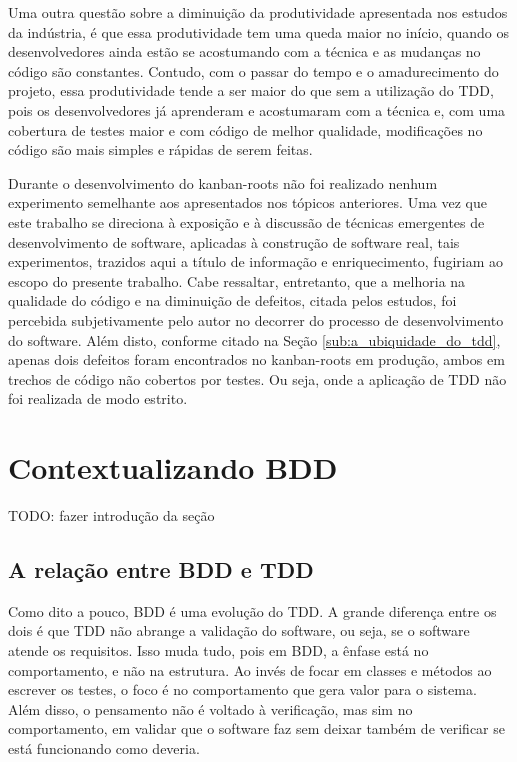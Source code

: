 Uma outra questão sobre a diminuição da produtividade apresentada nos estudos da indústria, é que essa produtividade tem uma queda maior no início, quando os desenvolvedores ainda estão se acostumando com a técnica e as mudanças no código são constantes. Contudo, com o passar do tempo e o amadurecimento do projeto, essa produtividade tende a ser maior do que sem a utilização do TDD, pois os desenvolvedores já aprenderam e acostumaram com a técnica e, com uma cobertura de testes maior e com código de melhor qualidade, modificações no código são mais simples e rápidas de serem feitas.

Durante o desenvolvimento do kanban-roots não foi realizado nenhum experimento semelhante aos apresentados nos tópicos anteriores. Uma vez que este trabalho se direciona à exposição e à discussão de técnicas emergentes de desenvolvimento de software, aplicadas à construção de software real, tais experimentos, trazidos aqui a título de informação e enriquecimento, fugiriam ao escopo do presente trabalho. Cabe ressaltar, entretanto, que a melhoria na qualidade do código e na diminuição de defeitos, citada pelos estudos, foi percebida subjetivamente pelo autor no decorrer do processo de desenvolvimento do software. Além disto, conforme citado na Seção \ref{sub:a_ubiquidade_do_tdd}, apenas dois defeitos foram encontrados no kanban-roots em produção, ambos em trechos de código não cobertos por testes. Ou seja, onde a aplicação de TDD não foi realizada de modo estrito.


\section{Contextualizando BDD}

TODO: fazer introdução da seção

\subsection{A relação entre BDD e TDD}
\label{sub:a_relacao_entre_bdd_e_tdd}

Como dito a pouco, BDD é uma evolução do TDD. A grande diferença entre os dois é que TDD não abrange a validação do software, ou seja, se o software atende os requisitos. Isso muda tudo, pois em BDD, a ênfase está no comportamento, e não na estrutura. Ao invés de focar em classes e métodos ao escrever os testes, o foco é no comportamento que gera valor para o sistema. Além disso, o pensamento não é voltado à verificação, mas sim no comportamento, em validar que o software faz sem deixar também de verificar se está funcionando como deveria.

